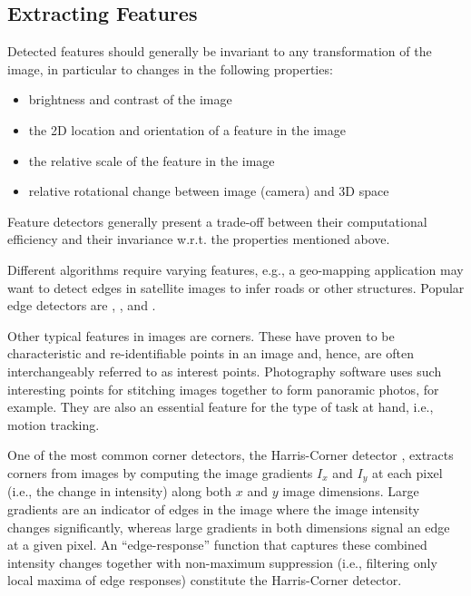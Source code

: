\documentclass[headsepline, hidelinks, footsepline, footinclude=false, oneside, fontsize=11pt, paper=a4, listof=totoc, bibliography=totoc]{scrbook}
\begin{document}
\subsection{Extracting Features \label{extracting-features}}
\label{sec:org5a9c395}
Detected features should generally be invariant to any transformation of the image, in particular to changes in the following properties:
\begin{itemize}
\item brightness and contrast of the image
\item the 2D location and orientation of a feature in the image
\item the relative scale of the feature in the image
\item relative rotational change between image (camera) and 3D space
\end{itemize}

Feature detectors generally present a trade-off between their computational efficiency and their invariance w.r.t. the properties mentioned above.

Different algorithms require varying features, e.g., a geo-mapping application may want to detect edges in satellite images to infer roads or other structures.
Popular edge detectors are \cite{cannyComputationalApproachEdge1986},  \cite{dericheUsingCannyCriteria1987}, and \cite{dimAlternativeApproachSatellite2013}.

Other typical features in images are corners. These have proven to be characteristic and re-identifiable points in an image and, hence, are often interchangeably referred to as interest points. 
Photography software uses such interesting points for stitching images together to form panoramic photos, for example. 
They are also an essential feature for the type of task at hand, i.e., motion tracking.

One of the most common corner detectors, the Harris-Corner detector \cite{harrisCombinedCornerEdge1988}, extracts corners from images by computing the image gradients \(I_x\) and \(I_y\) at each pixel 
(i.e., the change in intensity) along both \(x\) and \(y\) image dimensions. 
Large gradients are an indicator of edges in the image where the image intensity changes significantly, whereas large gradients in both dimensions signal an edge at a given pixel.
An ``edge-response'' function that captures these combined intensity changes together with non-maximum suppression (i.e., filtering only local maxima of edge responses) constitute the Harris-Corner detector.
\end{document}
